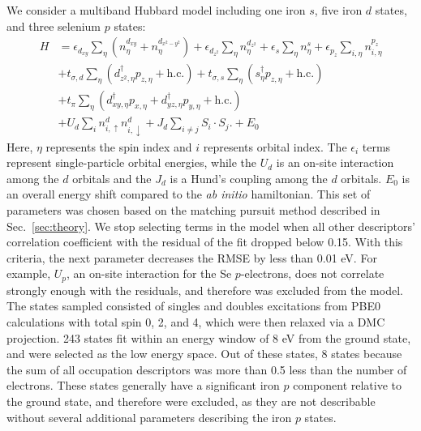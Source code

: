 We consider a multiband Hubbard model including one iron $s$, five iron $d$ states, and three selenium $p$ states:
\begin{align*}
  H 
  &=
  \epsilon_{d_{xy}} \sum_{\eta} (n^{d_{xy}}_{\eta}  + n^{d_{x^2-y^2}}_{\eta})
  +
  \epsilon_{d_{z^2}} \sum_{\eta} n^{d_{z^2}}_{\eta} 
  +
  \epsilon_s \sum_{\eta} n^{s}_{\eta} 
  +
  \epsilon_{p_{z}} \sum_{i,\eta} n^{p_{z}}_{i,\eta} 
  \\
  &+ 
  t_{\sigma,d} \sum_{\eta} \left( d_{z^2,\eta}^{\dagger} p_{z,\eta} + \text{h.c.} \right)
  +
  t_{\sigma,s} \sum_{\eta} \left(s_{\eta}^{\dagger}  p_{z,\eta} + \text{h.c.} \right)
  \\
  &+ 
  t_{\pi} \sum_{\eta} \left( d_{xy,\eta}^{\dagger} p_{x,\eta} + d_{yz,\eta}^{\dagger}  p_{y,\eta} + \text{h.c.} \right)
  \\
  &+
  U_d \sum_{i} n^{d}_{i,\uparrow} n^{d}_{i,\downarrow} 
  +
  J_d \sum_{i\ne j} S_i \cdot S_j.
  +
  E_0
\end{align*}
Here, $\eta$ represents the spin index and $i$ represents orbital index.
The $\epsilon_i$ terms represent single-particle orbital energies, while the $U_d$ is an on-site interaction among the $d$ orbitals and the $J_d$ is a Hund's coupling among the $d$ orbitals.
$E_0$ is an overall energy shift compared to the \textit{ab initio} hamiltonian.
This set of parameters was chosen based on the matching pursuit method described in Sec.~\ref{sec:theory}.
We stop selecting terms in the model when all other descriptors' correlation coefficient with the residual of the fit dropped below 0.15.
With this criteria, the next parameter decreases the RMSE by less than 0.01 eV.
For example, $U_p$, an on-site interaction for the Se $p$-electrons, does not correlate strongly enough with the residuals, and therefore was excluded from the model.
The states sampled consisted of singles and doubles excitations from PBE0 calculations with total spin 0, 2, and 4, which were then relaxed via a DMC projection.
243 states fit within an energy window of 8 eV from the ground state, and were selected as the low energy space.
Out of these states, 8 states because the sum of all occupation descriptors was more than 0.5 less than the number of electrons.
These states generally have a significant iron $p$ component relative to the ground state, and therefore were excluded, as they are not describable without several additional parameters describing the iron $p$ states.


